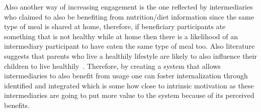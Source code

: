 Also another way of increasing engagement is the one reflected by intermediaries who claimed to also be benefiting from nutrition/diet information since the same type of meal is shared at home, therefore, if beneficiary participants ate something that is not healthy while at home then there is a likelihood of an intermediary participant to have eaten the same type of meal too. Also literature suggests that parents who live a healthily lifestyle are likely to also influence their children to live healthily~\citep{grimes2009toward}. Therefore, by creating a system that allows intermediaries to also benefit from usage one can foster internalization through identified and integrated which is some how close to intrinsic motivation  as these intermediaries are going to put more value to the system because of its perceived benefits.


  

\begin{flushright}
\end{flushright}

